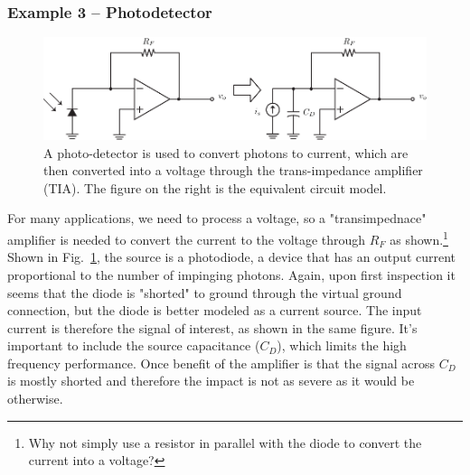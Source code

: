 \subsubsection{Example 3 – Photodetector}
\begin{figure}[tb]
\begin{center}
\includegraphics[width=.8\columnwidth]{ex_photodetect}
\end{center}
\caption{A photo-detector is used to convert photons to current, which are then converted into a voltage through the trans-impedance amplifier (TIA).  The figure on the right is the equivalent circuit model.} \label{fig:pd_detect}
\end{figure}
For many applications, we need to process a voltage, so a "transimpednace" amplifier is needed to convert the current to the voltage through $R_F$ as shown.\footnote{Why not simply use a resistor in parallel with the diode to convert the current into a voltage?}
Shown in Fig.~\ref{fig:pd_detect}, the source is a photodiode, a device that has an output current proportional to the number of impinging photons.  Again, upon first inspection it seems that the diode is "shorted" to ground through the virtual ground connection, but the diode is better modeled as a current source.  The input current is therefore the signal of interest, as shown in the same figure.  It's important to include the source capacitance ($C_D$), which limits the high frequency performance.  Once benefit of the amplifier is that the signal across $C_D$ is mostly shorted and therefore the impact is not as severe as it would be otherwise.
